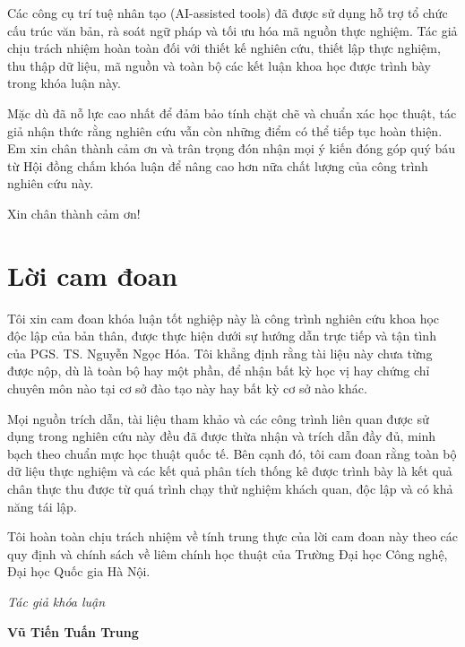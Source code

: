 \documentclass[12pt, a4paper, reqno, oneside]{book}
\begin{document}
Các công cụ trí tuệ nhân tạo (AI-assisted tools) đã được sử dụng hỗ trợ tổ chức cấu trúc văn bản, rà soát ngữ pháp và tối ưu hóa mã nguồn thực nghiệm. Tác giả chịu trách nhiệm hoàn toàn đối với thiết kế nghiên cứu, thiết lập thực nghiệm, thu thập dữ liệu, mã nguồn và toàn bộ các kết luận khoa học được trình bày trong khóa luận này.

Mặc dù đã nỗ lực cao nhất để đảm bảo tính chặt chẽ và chuẩn xác học thuật, tác giả nhận thức rằng nghiên cứu vẫn còn những điểm có thể tiếp tục hoàn thiện. Em xin chân thành cảm ơn và trân trọng đón nhận mọi ý kiến đóng góp quý báu từ Hội đồng chấm khóa luận để nâng cao hơn nữa chất lượng của công trình nghiên cứu này.

Xin chân thành cảm ơn!

\newpage

\chapter*{Lời cam đoan}
\vspace{20pt}

Tôi xin cam đoan khóa luận tốt nghiệp này là công trình nghiên cứu khoa học độc lập của bản thân, được thực hiện dưới sự hướng dẫn trực tiếp và tận tình của PGS. TS. Nguyễn Ngọc Hóa. Tôi khẳng định rằng tài liệu này chưa từng được nộp, dù là toàn bộ hay một phần, để nhận bất kỳ học vị hay chứng chỉ chuyên môn nào tại cơ sở đào tạo này hay bất kỳ cơ sở nào khác.

Mọi nguồn trích dẫn, tài liệu tham khảo và các công trình liên quan được sử dụng trong nghiên cứu này đều đã được thừa nhận và trích dẫn đầy đủ, minh bạch theo chuẩn mực học thuật quốc tế. Bên cạnh đó, tôi cam đoan rằng toàn bộ dữ liệu thực nghiệm và các kết quả phân tích thống kê được trình bày là kết quả chân thực thu được từ quá trình chạy thử nghiệm khách quan, độc lập và có khả năng tái lập.

Tôi hoàn toàn chịu trách nhiệm về tính trung thực của lời cam đoan này theo các quy định và chính sách về liêm chính học thuật của Trường Đại học Công nghệ, Đại học Quốc gia Hà Nội.

\begin{flushright}
{\it Tác giả khóa luận}
\hskip 1.5cm\quad

\vskip 2cm
{\bf Vũ Tiến Tuấn Trung }  \quad\ \quad
\end{flushright}
\newpage

\end{document}
